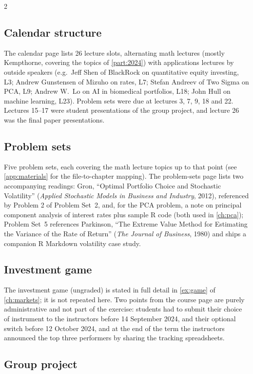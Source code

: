 \begin{paracol}{2}
\subsection{Calendar structure}

The calendar page lists 26 lecture slots, alternating math lectures (mostly Kempthorne, covering the
topics of \cref{part:2024}) with applications lectures by outside speakers (e.g.\ Jeff Shen of
BlackRock on quantitative equity investing, L3; Andrew Gunstensen of Mizuho on rates, L7; Stefan
Andreev of Two Sigma on PCA, L9; Andrew W.~Lo on AI in biomedical portfolios, L18; John Hull on
machine learning, L23). Problem sets were due at lectures 3, 7, 9, 18 and 22. Lectures 15--17 were
student presentations of the group project, and lecture 26 was the final paper presentations.

\subsection{Problem sets}

Five problem sets, each covering the math lecture topics up to that point (see
\cref{app:materials} for the file-to-chapter mapping). The problem-sets page lists two accompanying
readings: Gron, ``Optimal Portfolio Choice and Stochastic Volatility'' (\emph{Applied Stochastic
Models in Business and Industry}, 2012), referenced by Problem 2 of Problem Set~2, and, for the PCA
problem, a note on principal component analysis of interest rates plus sample R code (both used in
\cref{ch:pca}); Problem Set~5 references Parkinson, ``The Extreme Value Method for Estimating the
Variance of the Rate of Return'' (\emph{The Journal of Business}, 1980) and ships a companion R
Markdown volatility case study.

\subsection{Investment game}\label{appC:game}

The investment game (ungraded) is stated in full detail in \cref{ex:game} of \cref{ch:markets}; it
is not repeated here. Two points from the course page are purely administrative and not part of the
exercise: students had to submit their choice of instrument to the instructors before 14 September
2024, and their optional switch before 12 October 2024, and at the end of the term the instructors
announced the top three performers by sharing the tracking spreadsheets.

\subsection{Group project}


\end{paracol}
